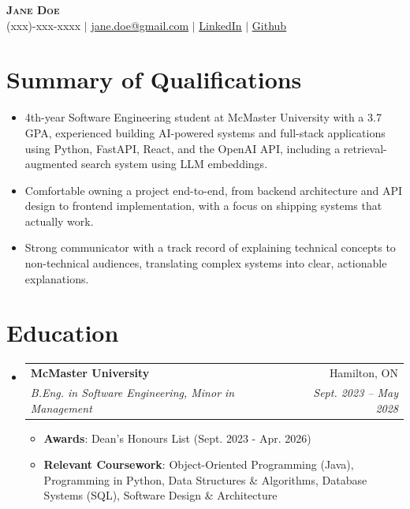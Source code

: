 \documentclass[letterpaper,11pt]{article}
\makeatletter
\newcommand{\resumeItem}[1]{
  \item\small{
    {#1 \vspace{-2pt}}
  }
}
\newcommand{\resumeSubheading}[4]{
  \vspace{-2pt}\item
    \begin{tabular*}{0.97\textwidth}[t]{l@{\extracolsep{\fill}}r}
      \textbf{#1} & #2 \\
      \textit{\small#3} & \textit{\small #4} \\
    \end{tabular*}\vspace{-7pt}
}
\newcommand{\resumeSubHeadingListStart}{\begin{itemize}[leftmargin=0.15in, label={}]}
\newcommand{\resumeSubHeadingListEnd}{\end{itemize}}
\newcommand{\resumeItemListStart}{\begin{itemize}}
\newcommand{\resumeItemListEnd}{\end{itemize}\vspace{-5pt}}
\makeatother
\begin{document}

\begin{center}
    \textbf{\Huge \scshape Jane Doe} \\ \vspace{1pt}
    \small (xxx)-xxx-xxxx $|$ \href{google.com}{\underline{jane.doe@gmail.com}} $|$ 
    \href{https://www.linkedin.com}{\underline{LinkedIn}} $|$
    \href{https://github.com}{\underline{Github}}
\end{center}

\section{Summary of Qualifications}
  \resumeItemListStart
    \resumeItem{4th-year Software Engineering student at McMaster University with a 3.7 GPA, experienced building AI-powered systems and full-stack applications using Python, FastAPI, React, and the OpenAI API, including a retrieval-augmented search system using LLM embeddings.}
    \resumeItem{Comfortable owning a project end-to-end, from backend architecture and API design to frontend implementation, with a focus on shipping systems that actually work.}
    \resumeItem{Strong communicator with a track record of explaining technical concepts to non-technical audiences, translating complex systems into clear, actionable explanations.}
  \resumeItemListEnd


\section{Education}
  \resumeSubHeadingListStart
    \resumeSubheading
      {McMaster University}{Hamilton, ON}
      {B.Eng. in Software Engineering, Minor in Management}{Sept. 2023 -- May 2028}
    \resumeItemListStart
        \resumeItem{\textbf{Awards}: Dean's Honours List (Sept. 2023 - Apr. 2026)}
        \resumeItem{\textbf{Relevant Coursework}: Object-Oriented Programming (Java), Programming in Python, Data Structures \& Algorithms, Database Systems (SQL), Software Design \& Architecture}
      \resumeItemListEnd
  \resumeSubHeadingListEnd
\end{document}
